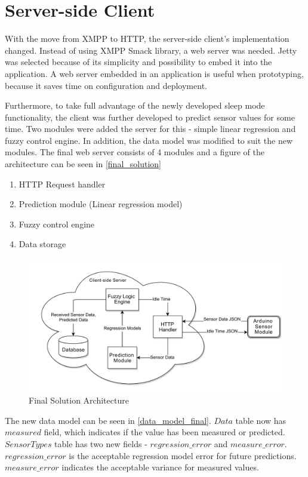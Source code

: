 \section{Server-side Client}

With the move from XMPP to HTTP, the server-side client's implementation changed. Instead of using XMPP Smack library, a web server was needed. Jetty was selected because of its simplicity and possibility to embed it into the application. A web server embedded in an application is useful when prototyping, because it saves time on configuration and deployment. 

Furthermore, to take full advantage of the newly developed sleep mode functionality, the client was further developed to predict sensor values for some time. Two modules were added the server for this - simple linear regression and fuzzy control engine. In addition, the data model was modified to suit the new modules. The final web server consists of 4 modules and a figure of the architecture can be seen in \autoref{final_solution}

\begin{enumerate}
\item HTTP Request handler
\item Prediction module (Linear regression model)
\item Fuzzy control engine
\item Data storage
\end{enumerate}

\begin{figure}[h!]
\centering
\includegraphics[scale=0.58]{4/figures/final_solution.pdf}
\caption{Final Solution Architecture}
\label{final_solution}
\end{figure}

The new data model can be seen in \autoref{data_model_final}. $Data$ table now has $measured$ field, which indicates if the value has been measured or predicted. $SensorTypes$ table has two new fields - $regression\_error$ and $measure\_error$. $regression\_error$ is the acceptable regression model error for future predictions. $measure\_error$ indicates the acceptable variance for measured values. 

